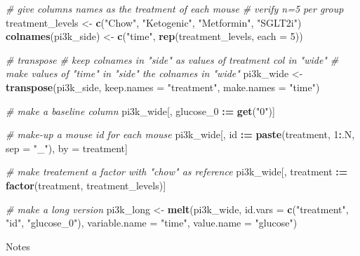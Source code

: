 \documentclass[]{book}
\newenvironment{Shaded}{\begin{snugshade}}{\end{snugshade}}
\newcommand{\CommentTok}[1]{\textcolor[rgb]{0.56,0.35,0.01}{\textit{#1}}}
\newcommand{\DataTypeTok}[1]{\textcolor[rgb]{0.13,0.29,0.53}{#1}}
\newcommand{\DecValTok}[1]{\textcolor[rgb]{0.00,0.00,0.81}{#1}}
\newcommand{\ErrorTok}[1]{\textcolor[rgb]{0.64,0.00,0.00}{\textbf{#1}}}
\newcommand{\KeywordTok}[1]{\textcolor[rgb]{0.13,0.29,0.53}{\textbf{#1}}}
\newcommand{\NormalTok}[1]{#1}
\newcommand{\OperatorTok}[1]{\textcolor[rgb]{0.81,0.36,0.00}{\textbf{#1}}}
\newcommand{\StringTok}[1]{\textcolor[rgb]{0.31,0.60,0.02}{#1}}
\begin{document}
\begin{Shaded}
\begin{Highlighting}[]
\CommentTok{# give columns names as the treatment of each mouse}
\CommentTok{# verify n=5 per group}
\NormalTok{treatment_levels <-}\StringTok{ }\KeywordTok{c}\NormalTok{(}\StringTok{"Chow"}\NormalTok{, }\StringTok{"Ketogenic"}\NormalTok{, }\StringTok{"Metformin"}\NormalTok{, }\StringTok{"SGLT2i"}\NormalTok{)}
\KeywordTok{colnames}\NormalTok{(pi3k_side) <-}\StringTok{ }\KeywordTok{c}\NormalTok{(}\StringTok{"time"}\NormalTok{,}
                         \KeywordTok{rep}\NormalTok{(treatment_levels, }\DataTypeTok{each =} \DecValTok{5}\NormalTok{))}

\CommentTok{# transpose}
\CommentTok{# keep colnames in "side" as values of treatment col in "wide"}
\CommentTok{# make values of "time" in "side" the colnames in "wide"}
\NormalTok{pi3k_wide <-}\StringTok{ }\KeywordTok{transpose}\NormalTok{(pi3k_side,}
                       \DataTypeTok{keep.names =} \StringTok{"treatment"}\NormalTok{, }
                       \DataTypeTok{make.names =} \StringTok{"time"}\NormalTok{)}

\CommentTok{# make a baseline column }
\NormalTok{pi3k_wide[, glucose_}\DecValTok{0} \OperatorTok{:}\ErrorTok{=}\StringTok{ }\KeywordTok{get}\NormalTok{(}\StringTok{"0"}\NormalTok{)]}

\CommentTok{# make-up a mouse id for each mouse}
\NormalTok{pi3k_wide[, id }\OperatorTok{:}\ErrorTok{=}\StringTok{ }\KeywordTok{paste}\NormalTok{(treatment, }\DecValTok{1}\OperatorTok{:}\NormalTok{.N, }\DataTypeTok{sep =} \StringTok{"_"}\NormalTok{), by =}\StringTok{ }\NormalTok{treatment]}

\CommentTok{# make treatement a factor with "chow" as reference}
\NormalTok{pi3k_wide[, treatment }\OperatorTok{:}\ErrorTok{=}\StringTok{ }\KeywordTok{factor}\NormalTok{(treatment, treatment_levels)]}

\CommentTok{# make a long version}
\NormalTok{pi3k_long <-}\StringTok{ }\KeywordTok{melt}\NormalTok{(pi3k_wide,}
                  \DataTypeTok{id.vars =} \KeywordTok{c}\NormalTok{(}\StringTok{"treatment"}\NormalTok{, }\StringTok{"id"}\NormalTok{, }\StringTok{"glucose_0"}\NormalTok{),}
                  \DataTypeTok{variable.name =} \StringTok{"time"}\NormalTok{,}
                  \DataTypeTok{value.name =} \StringTok{"glucose"}\NormalTok{)}
\end{Highlighting}
\end{Shaded}

Notes
\end{document}
